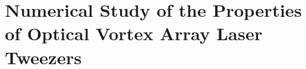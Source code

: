 \section{Numerical Study of the Properties of Optical Vortex Array Laser Tweezers}
\label{sec:tweezers}